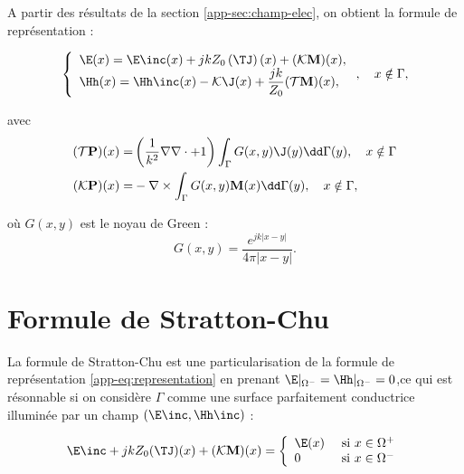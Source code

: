 A partir des résultats de la section \ref{app-sec:champ-elec}, on obtient la formule de représentation :

\begin{equation}
    \left\{\begin{array}{l}
        \E(x) = \E\inc(x) + jkZ_0\left(\TJ\right)(x) + (\mathcal K\mathbf M)(x),\\
        \Hh(x) = \Hh\inc(x) - \mathcal K\J(x) + \dfrac{jk}{Z_0}(\mathcal T\mathbf M)(x),
    \end{array}\right.,\quad x\notin\Gamma,
\end{equation}

avec
\begin{equation}
    \begin{split}
        (\mathcal T\mathbf P)(x) =& \left(\frac1{k^2}\nabla\nabla\cdot+1\right)\int_\Gamma G(x,y)\J(y)\dd\Gamma(y),\quad x\notin\Gamma \\
        (\mathcal K\mathbf P)(x) =& -\nabla\times\int_\Gamma G(x,y)\mathbf M(x)\dd\Gamma(y),\quad x\notin\Gamma,
    \end{split}
    \label{app-eq:representation}
\end{equation}

où $G(x,y)$ est le noyau de Green : $$G(x,y) = \frac{e^{jk|x-y|}}{4\pi|x-y|}.$$



\section{Formule de Stratton-Chu}
La formule de Stratton-Chu est une particularisation de la formule de représentation \eqref{app-eq:representation} en prenant $\E|_{\Omega^-} = \Hh|_{\Omega^-} = 0$,ce qui est résonnable si on considère $\Gamma$ comme une surface parfaitement conductrice illuminée par un champ $\left(\E\inc,\Hh\inc\right)$ :

\begin{equation}
    \E\inc + jkZ_0(\TJ)(x) + (\mathcal K\mathbf M)(x) = \left\{\begin{array}{lr}
        \E(x)&\text{ si } x\in\Omega^+\\
        0&\text{ si } x\in\Omega^-
    \end{array}\right.
\end{equation}
\printbibliography[heading=subbibintoc]